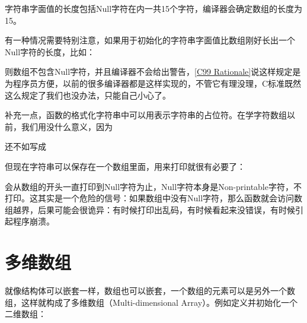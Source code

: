 字符串字面值的长度包括Null字符在内一共15个字符，编译器会确定数组的长度为15。



有一种情况需要特别注意，如果用于初始化的字符串字面值比数组刚好长出一个Null字符的长度，比如：




则数组不包含Null字符，并且编译器不会给出警告，\hyperlink{db.bi01.bibli.rationale}{[C99 Rationale]}说这样规定是为程序员方便，以前的很多编译器都是这样实现的，不管它有理没理，C标准既然这么规定了我们也没办法，只能自己小心了。



补充一点，函数的格式化字符串中可以用表示字符串的占位符。在学字符数组以前，我们用没什么意义，因为




还不如写成




但现在字符串可以保存在一个数组里面，用来打印就很有必要了：




会从数组的开头一直打印到Null字符为止，Null字符本身是Non-printable字符，不打印。这其实是一个危险的信号：如果数组中没有Null字符，那么函数就会访问数组越界，后果可能会很诡异：有时候打印出乱码，有时候看起来没错误，有时候引起程序崩溃。




\section{多维数组}
%
就像结构体可以嵌套一样，数组也可以嵌套，一个数组的元素可以是另外一个数组，这样就构成了多维数组（Multi-dimensional Array）。例如定义并初始化一个二维数组：




